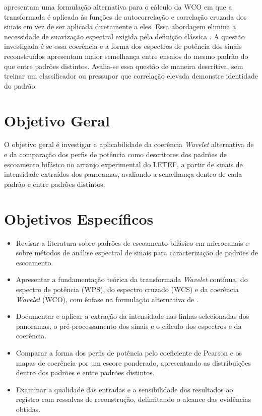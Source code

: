  apresentam uma formulação alternativa para o cálculo da WCO em
que a transformada é aplicada às funções de autocorrelação e correlação cruzada dos sinais
em vez de ser aplicada diretamente a eles. Essa abordagem elimina a necessidade de
suavização espectral exigida pela definição clássica \cite{torrence1998}. A questão
investigada é se essa coerência e a forma dos espectros de potência dos sinais
reconstruídos apresentam maior semelhança entre ensaios do mesmo padrão do que entre
padrões distintos. Avalia-se essa questão de maneira descritiva, sem treinar um
classificador ou pressupor que correlação elevada demonstre identidade do padrão.

\section{Objetivo Geral}

O objetivo geral é investigar a aplicabilidade da coerência \textit{Wavelet} alternativa
de  e da comparação dos perfis de potência como descritores dos
padrões de escoamento bifásico no arranjo experimental do LETEF, a partir de sinais de
intensidade extraídos dos panoramas, avaliando a semelhança dentro de cada padrão e entre
padrões distintos.

\section{Objetivos Específicos}

\begin{itemize}
  \item Revisar a literatura sobre padrões de escoamento bifásico em microcanais e sobre
  métodos de análise espectral de sinais para caracterização de padrões de escoamento.
  \item Apresentar a fundamentação teórica da transformada \textit{Wavelet} contínua, do
  espectro de potência (WPS), do espectro cruzado (WCS) e da coerência \textit{Wavelet}
  (WCO), com ênfase na formulação alternativa de .
  \item Documentar e aplicar a extração da intensidade nas linhas selecionadas dos
  panoramas, o pré-processamento dos sinais e o cálculo dos espectros e da coerência.
  \item Comparar a forma dos perfis de potência pelo coeficiente de Pearson e os mapas
  de coerência por um escore ponderado, apresentando as distribuições dentro dos padrões
  e entre padrões distintos.
  \item Examinar a qualidade das entradas e a sensibilidade dos resultados ao registro
  com ressalvas de reconstrução, delimitando o alcance das evidências obtidas.
\end{itemize}

